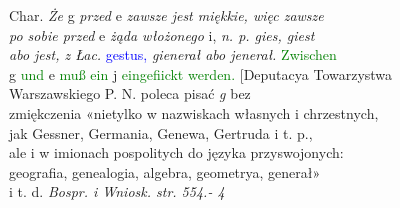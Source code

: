 \documentclass[12pt]{article}
\begin{document}
\vspace{0.3cm}
\textup{Char.} \textit{Że} \textup{g} \textit{przed} \textup{e} \textit{zawsze jest miękkie, więc zawsze} \\
\vspace{0.3cm}
\textit{po sobie przed} \textup{e} \textit{żąda włożonego} \textup{i,} \textit{n. p. gies, giest} \\
\vspace{0.3cm}
\textit{abo jest, z Łac.} \textcolor{blue}{gestus,} \textit{gienerał abo jenerał.} \textcolor{green}{Zwischen}\\
\vspace{0.3cm}
\textup{g} \textcolor{green}{und} \textup{e} \textcolor{green}{muß ein} \textup{j} \textcolor{green}{eingefiickt werden.} \textup{ [Deputacya Towarzystwa} \\
\vspace{0.3cm}
\textup{Warszawskiego P. N. poleca pisać} \textit{g} \textup{bez} \\
\vspace{0.3cm}
\textup{zmiękczenia «nietylko w nazwiskach własnych i chrzestnych,} \\
\vspace{0.3cm}
\textup{jak Gessner, Germania, Genewa, Gertruda i t. p.,} \\
\vspace{0.3cm}
\textup{ale i w imionach pospolitych do języka przyswojonych:} \\
\vspace{0.3cm}
\textup{geografia, genealogia, algebra, geometrya, generał»} \\
\vspace{0.3cm}
\textup{i t. d.} \textit{Bospr. i Wniosk. str. 554.- 4} \\
\end{document}
